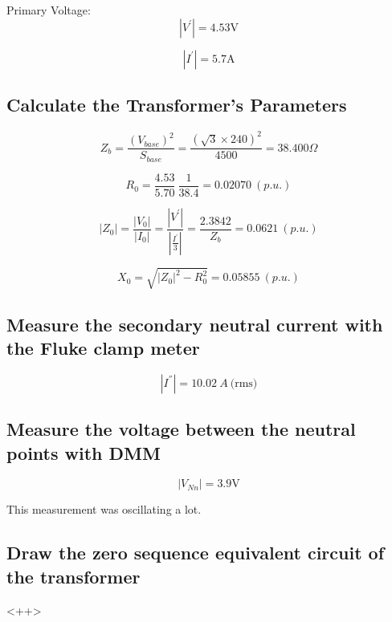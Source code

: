 \documentclass{article}
\begin{document}
Primary Voltage:
\begin{equation}
  | V^{'} | = 4.53 \text{V}
\end{equation} 

\begin{equation}
  | I^{'} | = 5.7 \text{A}
\end{equation} 

\subsection{Calculate the Transformer's Parameters} 

\begin{equation}
  Z_b = \frac{ \left( V_{base} \right)^2  }{S_{base}} = \frac{\left( \sqrt{3} \times 240 \right)^2}{4500} = 38.400 \Omega
\end{equation}

\begin{equation}
  R_0 = \frac{4.53}{5.70} \ \frac{1}{38.4} = 0.02070 \ (p.u.)
\end{equation}

\begin{equation}
  |Z_0 | = \frac{| V_0 |}{| I_0 |} = \frac{| V^{'} |}{| \frac{I^{'}}{3} |} = \frac{2.3842}{Z_b} = 0.0621 \ (p.u.)
\end{equation}

\begin{equation}
  X_{0} = \sqrt{| Z_0 |^{2} - R^2_0} = 0.05855  \ (p.u.)
\end{equation}

\subsection{Measure the secondary neutral current with the Fluke clamp meter} 

\begin{equation}
  | I^{''} | = 10.02 \ A \ \text{(rms)}
\end{equation}

\subsection{Measure the voltage between the neutral points with DMM} 
\begin{equation}
  | V_{Nn} | = 3.9 \text{V}
\end{equation}

This measurement was oscillating a lot.

\subsection{Draw the zero sequence equivalent circuit of the transformer}
<++>
\end{document}
